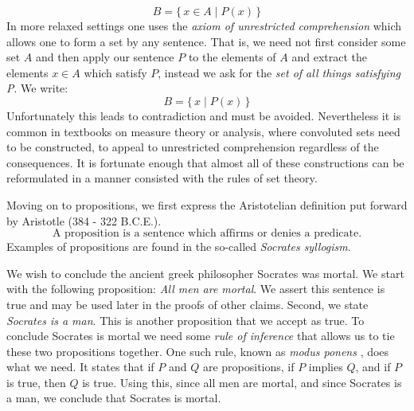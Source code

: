             \begin{equation}
                B=\{\,x\in{A}\;|\;P(x)\,\}
            \end{equation}
            In more relaxed settings one uses the \textit{axiom of unrestricted}
            \textit{comprehension} which
            allows one to form a set by any sentence. That is, we need not first
            consider some set $A$ and then apply our sentence $P$ to the elements of
            $A$ and extract the elements $x\in{A}$ which satisfy $P$, instead we
            ask for the \textit{set of all things satisfying P}. We write:
            \begin{equation}
                B=\{\,x\;|\;P(x)\,\}
            \end{equation}
            Unfortunately this leads to contradiction and must be avoided.
            Nevertheless it is common in textbooks on measure theory or
            analysis, where convoluted sets need to be constructed, to appeal
            to unrestricted comprehension regardless of the consequences. It is
            fortunate enough that almost all of these constructions can be
            reformulated in a manner consisted with the rules of set theory.
            \par\hfill\par
            Moving on to propositions, we first express the Aristotelian
            definition put forward by Aristotle
            (384 - 322 B.C.E.).
            \begin{equation}
                \text{A proposition is a sentence which affirms or denies a }
                \text{predicate.}
            \end{equation}
            Examples of propositions are found in the so-called
            \textit{Socrates syllogism}.
            \begin{example}
                We wish to conclude the ancient greek philosopher
                Socrates was mortal. We start with the
                following proposition: \textit{All men are mortal}. We assert
                this sentence is true and may be used later in the proofs of
                other claims. Second, we state \textit{Socrates is a man}.
                This is another proposition that we accept as true. To conclude
                Socrates is mortal we need some \textit{rule of inference} that
                allows us to tie these two propositions together. One such
                rule, known as \textit{modus ponens}%
                , does what we need. It states
                that if $P$ and $Q$ are propositions, if $P$ implies $Q$, and
                if $P$ is true, then $Q$ is true. Using this, since all men are
                mortal, and since Socrates is a man, we conclude that Socrates
                is mortal.
            \end{example}
